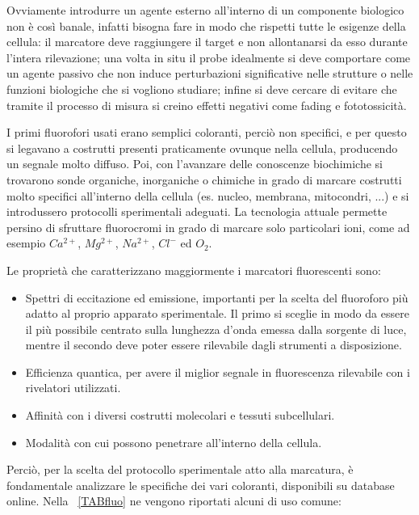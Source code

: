 Ovviamente introdurre un agente esterno all'interno di un componente biologico non è così banale, infatti bisogna fare in modo che rispetti tutte le esigenze della cellula: il marcatore deve raggiungere il target e non allontanarsi da esso durante l'intera rilevazione; una volta in situ il probe idealmente si deve comportare come un agente passivo che non induce perturbazioni significative nelle strutture o nelle funzioni biologiche che si vogliono studiare; infine si deve cercare di evitare che tramite il processo di misura si creino effetti negativi come fading e fototossicità.

I primi fluorofori usati erano semplici coloranti, perciò non specifici, e per questo si legavano a costrutti presenti praticamente ovunque nella cellula, producendo un segnale molto diffuso. 
Poi, con l'avanzare delle conoscenze biochimiche si trovarono sonde organiche, inorganiche o chimiche in grado di marcare costrutti molto specifici all'interno della cellula (es. nucleo, membrana, mitocondri, ...) e si introdussero protocolli sperimentali adeguati. 
La tecnologia attuale permette persino di sfruttare fluorocromi in grado di marcare solo particolari ioni, come ad esempio $Ca^{2+}$, $Mg^{2+}$, $Na^{2+}$, $Cl^-$ ed $O_2$.

Le proprietà che caratterizzano maggiormente i marcatori fluorescenti sono:
\begin{itemize}
\item Spettri di eccitazione ed emissione, importanti per la scelta del fluoroforo più adatto al proprio apparato sperimentale. 
Il primo si sceglie in modo da essere il più possibile centrato sulla lunghezza d'onda emessa dalla sorgente di luce, mentre il secondo deve poter essere rilevabile dagli strumenti a disposizione. 
\item Efficienza quantica, per avere il miglior segnale in fluorescenza rilevabile con i rivelatori utilizzati. 
\item Affinità con i diversi costrutti molecolari e tessuti subcellulari.
\item Modalità con cui possono penetrare all'interno della cellula.
\end{itemize}
Perciò, per la scelta del protocollo sperimentale atto alla marcatura, è fondamentale analizzare le specifiche dei vari coloranti, disponibili su database online. 
Nella \tablename~\ref{TABfluo} ne vengono riportati alcuni di uso comune:

